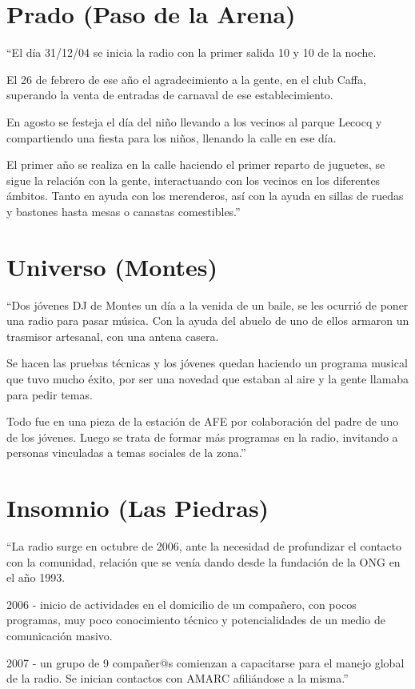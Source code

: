 \section*{Prado (Paso de la Arena)}
``El día 31/12/04 se inicia la radio con la primer salida 10 y 10 de la noche.

El 26 de febrero de ese año el agradecimiento a la gente, en el club Caffa, superando la venta de entradas de carnaval de ese establecimiento.

En agosto se festeja el día del niño llevando a los vecinos al parque Lecocq y compartiendo una fiesta para los niños, llenando la calle en ese día.

El primer año se realiza en la calle haciendo el primer reparto de juguetes, se sigue la relación con la gente, interactuando con los vecinos en los diferentes ámbitos. Tanto en ayuda con los merenderos, así con la ayuda en sillas de ruedas y bastones hasta mesas o canastas comestibles.''

\section*{Universo (Montes)}
``Dos jóvenes DJ de Montes un día a la venida de un baile, se les ocurrió de poner una radio para pasar música. Con la ayuda del abuelo de uno de ellos armaron un trasmisor artesanal, con una antena casera.

Se hacen las pruebas técnicas y los jóvenes quedan haciendo un programa musical que tuvo mucho éxito, por ser una novedad que estaban al aire y la gente llamaba para pedir temas.

Todo fue en una pieza de la estación de AFE por colaboración del padre de uno de los jóvenes. Luego se trata de formar más programas en la radio, invitando a personas vinculadas a temas sociales de la zona.''

\section*{Insomnio (Las Piedras)}
``La radio surge en octubre de 2006, ante la necesidad de profundizar el contacto con la comunidad, relación que se venía dando desde la fundación de la ONG en el año 1993.

2006 - inicio de actividades en el domicilio de un compañero, con pocos programas, muy poco conocimiento técnico y potencialidades de un medio de comunicación masivo.

2007 - un grupo de 9 compañer@s comienzan a capacitarse para el manejo global de la radio. Se inician contactos con AMARC afiliándose a la misma.''

